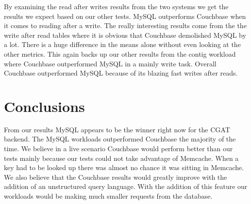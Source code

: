 \documentclass[]{IEEEtran}
\begin{document}
By examining the read after writes results from the two systems we get the results we expect based on our other tests. MySQL outperforms
Couchbase when it comes to reading after a write. The really interesting results come from the the write after read tables where it is obvious that
Couchbase demolished MySQL by a lot. There is a huge difference in the means alone without even looking at the other metrics. This again
backs up our other results from the contig workload where Couchbase outperformed MySQL in a mainly write task. Overall Couchbase outperformed MySQL because of its blazing fast writes after reads.

\section{Conclusions}\label{sec:conclusions}
From our results MySQL appears to be the winner right now for the CGAT backend. The MySQL workloads outperformed Couchbase the majority of the time. We believe in a live scenario Couchbase would perform better than our tests mainly because our tests could not take advantage of Memcache. When a key had to be looked up there was almost no chance it was sitting in Memcache. We also believe that the Couchbase results would greatly improve with the addition of an unstructured query language. With the addition of this feature our workloads would be making much smaller requests from the database. 

% 
% 
\end{document}
